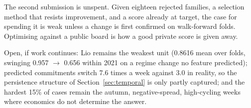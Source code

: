 The second submission is unspent. Given eighteen rejected families, a selection method that
resists improvement, and a score already at target, the case for spending it is weak unless a
change is first confirmed on walk-forward folds. Optimising against a public board is how a good
private score is given away.

Open, if work continues: Lio remains the weakest unit (0.8616 mean over folds, swinging 0.957
$\to$ 0.656 within 2021 on a regime change no feature predicted); predicted commitments switch
7.6 times a week against 3.0 in reality, so the persistence structure of
Section~\ref{sec:temporal} is only partly captured; and the hardest 15\% of cases remain the
autumn, negative-spread, high-cycling weeks where economics do not determine the answer.
